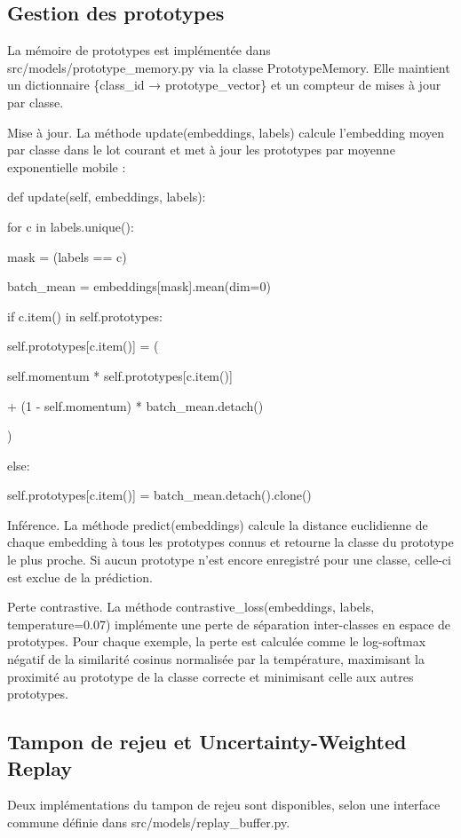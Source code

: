 \documentclass[a4paper,12pt]{report}
\begin{document}
\subsection{Gestion des prototypes}

La mémoire de prototypes est implémentée dans src/models/prototype\_memory.py via la classe PrototypeMemory. Elle maintient un dictionnaire \{class\_id → prototype\_vector\} et un compteur de mises à jour par classe.

Mise à jour. La méthode update(embeddings, labels) calcule l'embedding moyen par classe dans le lot courant et met à jour les prototypes par moyenne exponentielle mobile :

def update(self, embeddings, labels):

for c in labels.unique():

mask = (labels == c)

batch\_mean = embeddings[mask].mean(dim=0)

if c.item() in self.prototypes:

self.prototypes[c.item()] = (

self.momentum * self.prototypes[c.item()]

+ (1 - self.momentum) * batch\_mean.detach()

)

else:

self.prototypes[c.item()] = batch\_mean.detach().clone()

Inférence. La méthode predict(embeddings) calcule la distance euclidienne de chaque embedding à tous les prototypes connus et retourne la classe du prototype le plus proche. Si aucun prototype n'est encore enregistré pour une classe, celle-ci est exclue de la prédiction.

Perte contrastive. La méthode contrastive\_loss(embeddings, labels, temperature=0.07) implémente une perte de séparation inter-classes en espace de prototypes. Pour chaque exemple, la perte est calculée comme le log-softmax négatif de la similarité cosinus normalisée par la température, maximisant la proximité au prototype de la classe correcte et minimisant celle aux autres prototypes.

\subsection{Tampon de rejeu et Uncertainty-Weighted Replay}

Deux implémentations du tampon de rejeu sont disponibles, selon une interface commune définie dans src/models/replay\_buffer.py.
\end{document}
